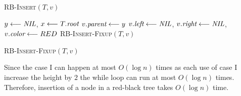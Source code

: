 \begin{minipage}{0.46\textwidth}
	\begin{algorithm}[H]
		\caption{\textsc{RB-Insert}$(T,v)$}
		\DontPrintSemicolon
		$y\longleftarrow \emph{NIL}$, $x\longleftarrow T.\emph{root}$\;
		$v.\emph{parent}\longleftarrow y$\;
		$v.\emph{left}\longleftarrow \emph{NIL}$,
		$v.\emph{right}\longleftarrow \emph{NIL}$, $v.\emph{color}\longleftarrow RED$\;
		\textsc{RB-Insert-Fixup}$(T,v)$\;
	\end{algorithm}
\end{minipage}\hfill
\begin{minipage}{0.5\textwidth}
	\begin{algorithm}[H]
		\caption{\textsc{RB-Insert-Fixup}$(T,v)$}
		\DontPrintSemicolon
	\end{algorithm}
\end{minipage}
\parinn

Since the case I can happen at most $O(\log n)$ times as each use of case I increase the height by $2$ the while loop can run at most $O(\log n)$ times. Therefore, insertion of a node in a red-black tree takes $O(\log n)$ time.

